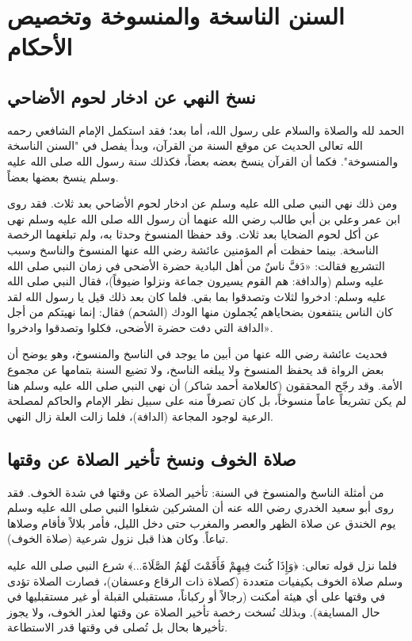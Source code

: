 \chapter{السنن الناسخة والمنسوخة وتخصيص الأحكام}

\section{نسخ النهي عن ادخار لحوم الأضاحي}
الحمد لله والصلاة والسلام على رسول الله، أما بعد؛ فقد استكمل الإمام الشافعي رحمه الله تعالى الحديث عن موقع السنة من القرآن، وبدأ يفصل في "السنن الناسخة والمنسوخة". فكما أن القرآن ينسخ بعضه بعضاً، فكذلك سنة رسول الله صلى الله عليه وسلم ينسخ بعضها بعضاً.

ومن ذلك نهي النبي صلى الله عليه وسلم عن ادخار لحوم الأضاحي بعد ثلاث. فقد روى ابن عمر وعلي بن أبي طالب رضي الله عنهما أن رسول الله صلى الله عليه وسلم نهى عن أكل لحوم الضحايا بعد ثلاث. وقد حفظا المنسوخ وحدثا به، ولم تبلغهما الرخصة الناسخة.
بينما حفظت أم المؤمنين عائشة رضي الله عنها المنسوخ والناسخ وسبب التشريع فقالت: «دَفَّ ناسٌ من أهل البادية حضرة الأضحى في زمان النبي صلى الله عليه وسلم (والدافة: هم القوم يسيرون جماعة ونزلوا ضيوفاً)، فقال النبي صلى الله عليه وسلم: ادخروا لثلاث وتصدقوا بما بقي. فلما كان بعد ذلك قيل يا رسول الله لقد كان الناس ينتفعون بضحاياهم يُجملون منها الودك (الشحم) فقال: إنما نهيتكم من أجل الدافة التي دفت حضرة الأضحى، فكلوا وتصدقوا وادخروا».

فحديث عائشة رضي الله عنها من أبين ما يوجد في الناسخ والمنسوخ، وهو يوضح أن بعض الرواة قد يحفظ المنسوخ ولا يبلغه الناسخ، ولا تضيع السنة بتمامها عن مجموع الأمة. 
وقد رجّح المحققون (كالعلامة أحمد شاكر) أن نهي النبي صلى الله عليه وسلم هنا لم يكن تشريعاً عاماً منسوخاً، بل كان تصرفاً منه على سبيل نظر الإمام والحاكم لمصلحة الرعية لوجود المجاعة (الدافة)، فلما زالت العلة زال النهي.

\section{صلاة الخوف ونسخ تأخير الصلاة عن وقتها}
من أمثلة الناسخ والمنسوخ في السنة: تأخير الصلاة عن وقتها في شدة الخوف.
فقد روى أبو سعيد الخدري رضي الله عنه أن المشركين شغلوا النبي صلى الله عليه وسلم يوم الخندق عن صلاة الظهر والعصر والمغرب حتى دخل الليل، فأمر بلالاً فأقام وصلاها تباعاً. وكان هذا قبل نزول شرعية (صلاة الخوف).

فلما نزل قوله تعالى: ﴿وَإِذَا كُنتَ فِيهِمْ فَأَقَمْتَ لَهُمُ الصَّلَاةَ...﴾ شرع النبي صلى الله عليه وسلم صلاة الخوف بكيفيات متعددة (كصلاة ذات الرقاع وعسفان)، فصارت الصلاة تؤدى في وقتها على أي هيئة أمكنت (رجالاً أو ركباناً، مستقبلي القبلة أو غير مستقبليها في حال المسايفة). وبذلك نُسخت رخصة تأخير الصلاة عن وقتها لعذر الخوف، ولا يجوز تأخيرها بحال بل تُصلى في وقتها قدر الاستطاعة.


